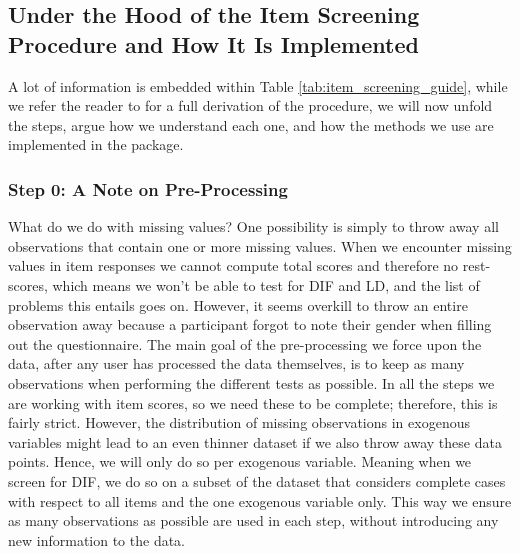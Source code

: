 \documentclass[a4project,12pt]{article}
\theoremstyle{examplestyle}
\theoremstyle{defstyle}
\theoremstyle{thmstyle}
\begin{document}
\subsection{Under the Hood of the Item Screening Procedure and How It Is Implemented}
A lot of information is embedded within Table \ref{tab:item_screening_guide}, while we refer the reader to \cite{Kreiner_Christensen_2011} for a full derivation of the procedure, we will now unfold the steps, argue how we understand each one, and how the methods we use are implemented in the package. 

\subsubsection{Step 0: A Note on Pre-Processing}
What do we do with missing values? One possibility is simply to throw away all observations that contain one or more missing values. When we encounter missing values in item responses we cannot compute total scores and therefore no rest-scores, which means we won't be able to test for DIF and LD, and the list of problems this entails goes on. However, it seems overkill to throw an entire observation away because a participant forgot to note their gender when filling out the questionnaire. The main goal of the pre-processing we force upon the data, after any user has processed the data themselves, is to keep as many observations when performing the different tests as possible. In all the steps we are working with item scores, so we need these to be complete; therefore, this is fairly strict. However, the distribution of missing observations in exogenous variables might lead to an even thinner dataset if we also throw away these data points. Hence, we will only do so per exogenous variable. Meaning when we screen for DIF, we do so on a subset of the dataset that considers complete cases with respect to all items and the one exogenous variable only. This way we ensure as many observations as possible are used in each step, without introducing any new information to the data. 
\end{document}
